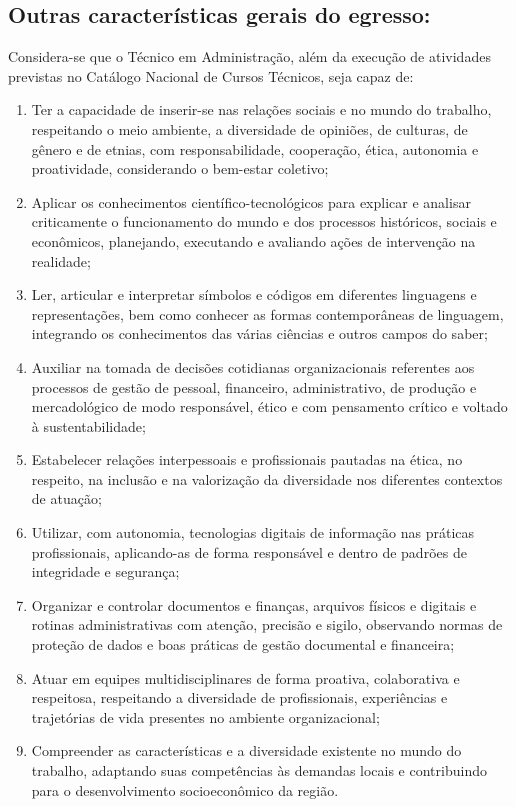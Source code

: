\documentclass{../../modelos/latex-shared/ifsc-ppc}
\begin{document}
\subsection{Outras características gerais do egresso:}
Considera-se que o Técnico em Administração, além da execução de atividades previstas no Catálogo Nacional de Cursos Técnicos, seja capaz de:
\begin{enumerate}
    \item Ter a capacidade de inserir-se nas relações sociais e no mundo do trabalho, respeitando o meio ambiente, a diversidade de opiniões, de culturas, de gênero e de etnias, com responsabilidade, cooperação, ética, autonomia e proatividade, considerando o bem-estar coletivo;
    \item Aplicar os conhecimentos científico-tecnológicos para explicar e analisar criticamente o funcionamento do mundo e dos processos históricos, sociais e econômicos, planejando, executando e avaliando ações de intervenção na realidade;
    \item Ler, articular e interpretar símbolos e códigos em diferentes linguagens e representações, bem como conhecer as formas contemporâneas de linguagem, integrando os conhecimentos das várias ciências e outros campos do saber;
    \item Auxiliar na tomada de decisões cotidianas organizacionais referentes aos processos de gestão de pessoal, financeiro, administrativo, de produção e mercadológico de modo responsável, ético e com pensamento crítico e voltado à sustentabilidade;
    \item Estabelecer relações interpessoais e profissionais pautadas na ética, no respeito, na inclusão e na valorização da diversidade nos diferentes contextos de atuação;
    \item Utilizar, com autonomia, tecnologias digitais de informação nas práticas profissionais, aplicando-as de forma responsável e dentro de padrões de integridade e segurança;
    \item Organizar e controlar documentos e finanças, arquivos físicos e digitais e rotinas administrativas com atenção, precisão e sigilo, observando normas de proteção de dados e boas práticas de gestão documental e financeira;
    \item Atuar em equipes multidisciplinares de forma proativa, colaborativa e respeitosa, respeitando a diversidade de profissionais, experiências e trajetórias de vida presentes no ambiente organizacional;
    \item Compreender as características e a diversidade existente no mundo do trabalho, adaptando suas competências às demandas locais e contribuindo para o desenvolvimento socioeconômico da região.
\end{enumerate}
\end{document}
